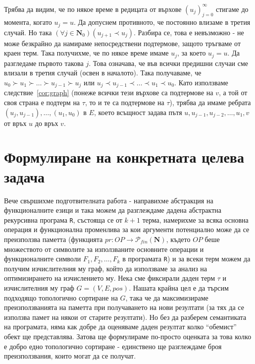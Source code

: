 \documentclass[12pt,twoside,a4paper]{article}
\begin{document}
\begin{statement}
		Трябва да видим, че по някое време в редицата от върхове $(u_j)_{j=0}^\infty$ стигаме до момента, когато $u_j = u$. Да допуснем противното, че постоянно влизаме в третия случай. Но така $(\forall j \in \mathbf{N}_0)(u_{j+1} \prec u_j)$. Разбира се, това е невъзможно - не може безкрайно да намираме непосредствени подтермове, защото тръгваме от краен терм. Така получихме, че по някое време имаме $u_j$, за което $u_j = u$. Да разгледаме първото такова $j$. Това означава, че във всички предишни случаи сме влизали в третия случай (освен в началото). Така получаваме, че $u_0 \succ u_1 \succ \dots \succ u_{j-1} \succ u_j$ или $u_j \prec u_{j-1} \prec \dots \prec u_1 \prec u_0$. Като използваме следствие~\ref{cor:graph} (понеже всички тези върхове са подтермове на $v$, а той от своя страна е подтерм на $\tau$, то и те са подтермове на $\tau$), трябва да имаме ребрата $(u_j, u_{j-1}), \dots, (u_1, u_0)$ в $E$, което всъщност задава пътя $u, u_{j-1}, u_{j-2}, \dots, u_1, v$ от връх $u$ до връх $v$.
	\end{statement}
	
	\section{Формулиране на конкретната целева задача}
	Вече свършихме подготвителната работа - направихме абстракция на функционалните езици и така можем да разглеждаме дадена абстрактна рекурсивна програма \texttt{R}, състояща се от $k+1$ терма, намерихме за всяка основна операция и функционална променлива за кои аргументи потенциално може да се преизползва паметта (функцията $pr\colon OP \to \mathcal{P}_{fin}(\mathbf{N})$, където $OP$ беше множеството от символите за използваните основните операции и функционалните символи $F_1, F_2, \dots, F_k$ в програмата \texttt{R}) и за всеки терм можем да получим изчислителния му граф, който да използваме за анализ на оптимизирането на изчислението му. Нека сме фиксирали даден терм $\tau$ и изчислителния му граф $G=(V,E,pos)$. Нашата крайна цел е да търсим подходящо топологично сортиране на $G$, така че да максимизираме преизползванията на паметта при получаването на нови резултати (за тях да се използва памет на някои от старите резултати). Но без да разберем семантиката на програмата, няма как добре да оценяваме даден резултат колко "`обемист"' обект ще представлява. Затова ще формулираме по-просто оценката за това колко е добро едно топологично сортиране - единствено ще разглеждаме броя преизползвания, които могат да се получат.
	
\end{document}
